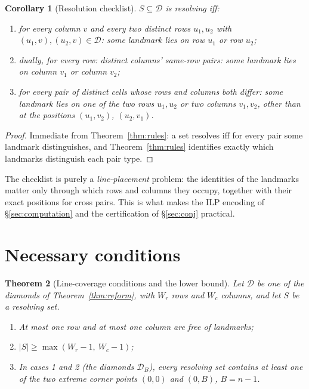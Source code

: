 \documentclass[12pt]{article}
\newtheorem{theorem}{Theorem}
\newtheorem{corollary}[theorem]{Corollary}
\theoremstyle{definition}
\newcommand{\DD}{\mathcal{D}}
\begin{document}
\begin{corollary}[Resolution checklist]\label{cor:checklist}
$S\subseteq\DD$ is resolving iff:
\begin{enumerate}[label=\textup{(a\arabic*)},leftmargin=8mm,itemsep=1pt]
\item for every column $v$ and every two distinct rows $u_1,u_2$ with $(u_1,v),(u_2,v)\in\DD$: some landmark lies on row $u_1$ or row $u_2$;
\item dually, for every row: distinct columns' same-row pairs: some landmark lies on column $v_1$ or column $v_2$;
\item for every pair of distinct cells whose rows and columns both differ: some landmark lies on one of the two rows $u_1,u_2$ or two columns $v_1,v_2$, other than at the positions $(u_1,v_2)$, $(u_2,v_1)$.
\end{enumerate}
\end{corollary}

\begin{proof}
Immediate from Theorem~\ref{thm:rules}: a set resolves iff for every pair some landmark distinguishes, and Theorem~\ref{thm:rules} identifies exactly which landmarks distinguish each pair type.
\end{proof}

The checklist is purely a \emph{line-placement} problem: the identities of the landmarks matter only through which rows and columns they occupy, together with their exact positions for cross pairs. This is what makes the ILP encoding of \S\ref{sec:computation} and the certification of \S\ref{sec:conj} practical.

\section{Necessary conditions}\label{sec:cover}

\begin{theorem}[Line-coverage conditions and the lower bound]\label{thm:cover}
Let $\DD$ be one of the diamonds of Theorem~\ref{thm:reform}, with $W_r$ rows and $W_c$ columns, and let $S$ be a resolving set.
\begin{enumerate}[label=\textup{(\roman*)},leftmargin=6mm,itemsep=2pt]
\item At most one row and at most one column are free of landmarks;
\item $|S|\ge \max(W_r-1,\ W_c-1)$;
\item In cases 1 and 2 (the diamonds $\DD_B$), every resolving set contains at least one of the two extreme corner points $(0,0)$ and $(0,B)$, $B=n-1$.
\end{enumerate}
\end{theorem}
\end{document}
